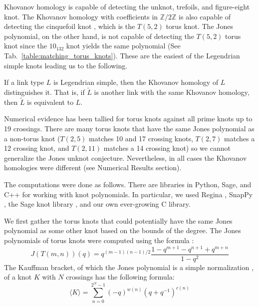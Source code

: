 Khovanov homology is capable of detecting the
unknot, trefoils, and figure-eight knot. The Khovanov homology with
coefficients in $\mathbb{Z}/2\mathbb{Z}$ is also capable of detecting
the cinquefoil knot \cite{BaldwinYingSivekCinquefoilKhovanov},
which is the $T(5,2)$ torus knot. The Jones
polynomial, on the other hand, is not capable of detecting the
$T(5,2)$ torus knot since the $10_{132}$ knot yields the same
polynomial (See Tab.~\ref{table:matching_torus_knots}).
These are the easiest of the Legendrian simple knots
leading us to the following.
\begin{conjecture}
    If a link type $L$ is Legendrian simple, then the Khovanov homology
    of $L$ distinguishes it. That is, if $\tilde{L}$
    is another link with the same Khovanov homology, then $\tilde{L}$ is
    equivalent to $L$.
\end{conjecture}
Numerical evidence has been tallied for torus knots
against all prime knots up to 19 crossings. There are many
torus knots that have the same Jones polynomial as a non-torus knot
($T(2,5)$ matches 10 and 17 crossing knots, $T(2,7)$
matches a 12 crossing knot, and $T(2,11)$ matches a 14 crossing knot)
so we cannot generalize the Jones unknot conjecture. Nevertheless, in
all cases the Khovanov homologies were different
(see Numerical Results section).
\par\hfill\par
The computations were done as follows. There are libraries in Python,
Sage, and C++ for working with knot polynomials. In particular, we used
Regina \cite{regina}, SnapPy \cite{SnapPy}, the Sage knot library
\cite{sage}, and our own ever-growing C library.
\par\hfill\par
We first gather the torus knots that could potentially have the same
Jones polynomial as some other knot based on the bounds of the degree.
The Jones polynomials of torus knots were computed using the formula
\cite{jonesfordummyvjones}:
\begin{equation}
    \label{eqn:jones_poly_torus}%
    J(T(m,n))(q)=q^{(m-1)(n-1)/2}
        \frac{1-q^{m+1}-q^{n+1}+q^{m+n}}{1-q^{2}}
\end{equation}
The Kauffman bracket, of which the Jones polynomial is a simple
normalization \cite{barnatan2002khovanov},
of a knot $K$ with $N$ crossings has the following formula:
\begin{equation}
    \langle{K}\rangle=\sum_{n=0}^{2^{N}-1}(-q)^{w(n)}(q+q^{-1})^{c(n)}
\end{equation}
